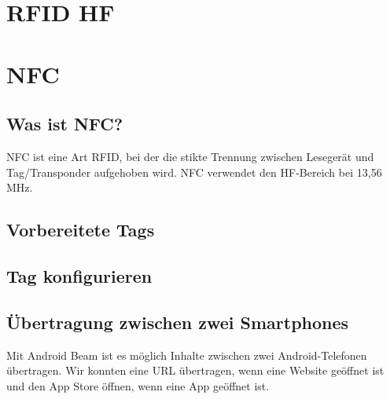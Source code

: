 \documentclass[11pt,a4paper,parskip=half]{scrartcl}
\begin{document}
\section{RFID HF}

\section{NFC}
\subsection{Was ist NFC?}
NFC ist eine Art RFID, bei der die stikte Trennung zwischen Lesegerät und Tag/Transponder aufgehoben wird.
NFC verwendet den HF-Bereich bei 13,56 MHz.
\subsection{Vorbereitete Tags}
\subsection{Tag konfigurieren}
\subsection{Übertragung zwischen zwei Smartphones}
Mit Android Beam ist es möglich Inhalte zwischen zwei Android-Telefonen übertragen.
Wir konnten eine URL übertragen, wenn eine Website geöffnet ist und den App Store
öffnen, wenn eine App geöffnet ist.
\end{document}
